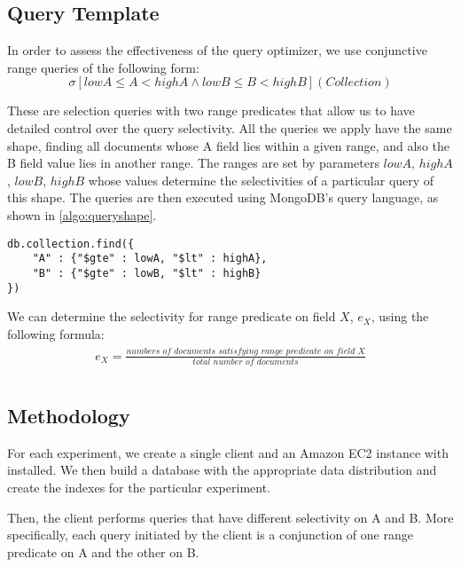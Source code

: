 \subsection{Query Template}
In order to assess the effectiveness of the query optimizer, we use conjunctive range queries of the following form:
$$ \sigma [ \mathit{lowA} \le A < \mathit{highA} \wedge \mathit{lowB} \le B < \mathit{highB} ] ( \mathit{Collection} ) $$

These are selection queries with two range predicates that allow us to have detailed control over the query selectivity. All the queries we apply have the same shape, finding all documents whose A field lies within a given range, and also the B field value lies in another range. The ranges are set by parameters $\mathit{lowA}$, $\mathit{highA}$, $\mathit{lowB}$, $\mathit{highB}$ whose values determine the selectivities of a particular query of this shape. The queries are then executed using MongoDB's query language, as shown in \autoref{algo:queryshape}.

\begin{lstlisting}[caption=Query Shape in MongoDB Query Syntax, label=algo:queryshape]
db.collection.find({
    "A" : {"$gte" : lowA, "$lt" : highA},
    "B" : {"$gte" : lowB, "$lt" : highB}
})
\end{lstlisting}

We can determine the selectivity for range predicate on field $X$, $e_X$, 
using the following formula:
\begin{align}
\begin{split}
 e_X= \frac{\textit{numbers of documents satisfying range 
 predicate on field X}}{\textit{total number of documents}} \\
 \end{split}
\end{align}

\subsection{Methodology}
For each experiment, we create a single client and an Amazon EC2 instance with \relname installed. We then build a database with the appropriate data distribution and create the indexes for the particular experiment.

Then, the client performs queries that have different selectivity on A and B. More specifically, each query initiated by the client is a conjunction of one range predicate on A and the other on B.

